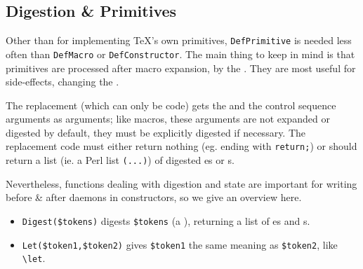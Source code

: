 \documentclass{book}
\begin{document}
\subsection[Digestion]{Digestion \& Primitives}\label{customization.latexml.digestion}
Other than for implementing \TeX's own primitives,
\texttt{DefPrimitive} is needed less often than \texttt{DefMacro} or \texttt{DefConstructor}.
 The main thing to keep in mind
is that primitives are processed after macro expansion,
by the .  They are most useful for
side-effects, changing the .

The replacement (which can only be code) gets
the  and the control sequence arguments
as arguments; like macros, these arguments are not expanded or digested
by default, they must be explicitly digested if necessary.
The replacement code must either return nothing (eg. ending with \verb|return;|) or
should return a list (ie. a Perl list \verb|(...)|)
of digested es or s.


Nevertheless, functions dealing with digestion and state are important for
writing before \& after daemons in constructors, so we give an overview here.
\begin{itemize}
\item \verb|Digest($tokens)|
digests \verb|$tokens| (a ), returning a list of es and s.
\item \verb|Let($token1,$token2)| gives \verb|$token1| the same meaning as \verb|$token2|,
 like \verb|\let|.
\end{itemize}
\end{document}
